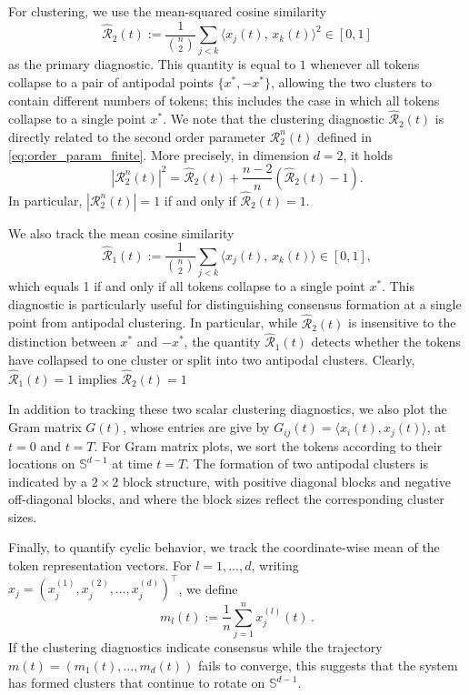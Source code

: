 \documentclass[10pt]{article}
\theoremstyle{definition}
\theoremstyle{definition}
\numberwithin{equation}{section}
\newcommand{\CR}{\mathcal{R}}
\begin{document}
For clustering,
we use the mean-squared cosine similarity
\begin{equation}
\widehat{\CR}_2(t) := \frac{1}{\binom{n}{2}} \sum_{j < k} \langle x_j(t),\, x_k(t)\rangle^2 \in [0,1]
\end{equation}
as the primary diagnostic. 
This quantity is equal to $1$ whenever all tokens collapse to a pair of antipodal points
$\{x^*, -x^*\}$, allowing the two clusters to contain different numbers of tokens; this includes the case in which all tokens collapse to a single point $x^*$.
We note that the clustering diagnostic $\widehat{\CR}_2(t)$ is directly related to the second order parameter $\CR^n_2(t)$ defined in \eqref{eq:order_param_finite}.
More precisely, in dimension $d=2$, it holds
\begin{equation*}
|\CR^n_2(t)|^2 = \widehat{\CR}_2(t) +  \frac{n-2}{n} (\widehat{\CR}_2(t) - 1).
\end{equation*}
In particular, $|\CR_2^n(t)| = 1$ if and only if $\widehat{\CR}_2(t) = 1$.

We also track the mean cosine similarity
\begin{equation}
    \widehat{\CR}_1(t) :=  \frac{1}{\binom{n}{2}} \sum_{j < k} \langle x_j(t),\, x_k(t)\rangle \in [0,1],
\end{equation}
which equals 1 if and only if all tokens collapse to a single point $x^*$. 
This diagnostic is particularly useful for distinguishing consensus formation at a single point from antipodal clustering.
In particular, while $\widehat{\CR}_2(t)$ is insensitive to the distinction between $x^*$ and $-x^*$, the quantity $\widehat{\CR}_1(t)$ detects whether the tokens have collapsed to one cluster or split into two antipodal clusters.
Clearly, $\widehat{\CR}_1(t)=1$ implies $\widehat{\CR}_2(t)=1$

In addition to tracking these two scalar clustering diagnostics, we also plot the Gram matrix $G(t)$, whose entries are give by $G_{ij}(t) = \langle x_i(t), x_j(t)\rangle$, at $t=0$ and
$t=T$.
For Gram matrix plots, we sort the tokens according to their locations on $\mathbb{S}^{d-1}$ at time $t = T$.
The formation of two antipodal clusters 
is indicated by a $2\times 2$ block structure, with positive diagonal blocks and negative off-diagonal blocks, and where the block sizes reflect the corresponding cluster sizes.

Finally, to quantify cyclic behavior, we track the coordinate-wise mean of the token representation vectors.
For $l = 1,\dots, d$, writing $x_j = (x_j^{(1)}, x_j^{(2)}, \dots, x_j^{(d)} )^{\top}$, we define
\begin{equation}
m_l (t) := \frac{1}{n} \sum_{j=1}^n x_j^{(l)} (t) \, .
\end{equation}
If the clustering diagnostics indicate consensus while the trajectory $m(t) = (m_1(t), \dots, m_d(t))$ fails to converge, this suggests that the system has formed clusters that continue to rotate on $\mathbb{S}^{d-1}$.
\end{document}
